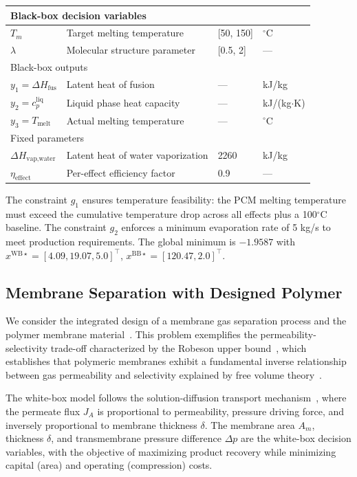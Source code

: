 \documentclass[12pt,a4paper]{article}%
\theoremstyle{plain}%
\theoremstyle{remark}%
\theoremstyle{definition}%
\def\WB{\mathrm{WB}}
\def\BB{\mathrm{BB}}
\begin{document}
\begin{appendices}
\begin{table}[htbp]
\begin{tabular}{@{}llll@{}}
\midrule
\multicolumn{4}{l}{Black-box decision variables} \\
\midrule
$T_m$ & Target melting temperature & [50, 150] & $^\circ$C \\
$\lambda$ & Molecular structure parameter & [0.5, 2] & --- \\
\midrule
\multicolumn{4}{l}{Black-box outputs} \\
\midrule
$y_1 = \Delta H_{\text{fus}}$ & Latent heat of fusion & --- & kJ/kg \\
$y_2 = c_p^{\text{liq}}$ & Liquid phase heat capacity & --- & kJ/(kg$\cdot$K) \\
$y_3 = T_{\text{melt}}$ & Actual melting temperature & --- & $^\circ$C \\
\midrule
\multicolumn{4}{l}{Fixed parameters} \\
\midrule
$\Delta H_{\text{vap,water}}$ & Latent heat of water vaporization & 2260 & kJ/kg \\
$\eta_{\text{effect}}$ & Per-effect efficiency factor & 0.9 & --- \\
\bottomrule
\end{tabular}
\end{table}

The constraint $g_1$ ensures temperature feasibility: the PCM melting temperature must exceed the cumulative temperature drop across all effects plus a 100$^\circ$C baseline. The constraint $g_2$ enforces a minimum evaporation rate of 5 kg/s to meet production requirements. The global minimum is $-1.9587$ with $x^{\WB\star} = [4.09, 19.07, 5.0]^\top$, $x^{\BB\star} = [120.47, 2.0]^\top$.

\subsection{Membrane Separation with Designed Polymer}\label{subsec:app_membrane}

We consider the integrated design of a membrane gas separation process and the polymer membrane material~\cite{qi2000membrane}. This problem exemplifies the permeability-selectivity trade-off characterized by the Robeson upper bound~\cite{robeson1991correlation,robeson2008upper}, which establishes that polymeric membranes exhibit a fundamental inverse relationship between gas permeability and selectivity explained by free volume theory~\cite{freeman1999basis}.

The white-box model follows the solution-diffusion transport mechanism~\cite{wijmans1995solution}, where the permeate flux $J_A$ is proportional to permeability, pressure driving force, and inversely proportional to membrane thickness $\delta$. The membrane area $A_m$, thickness $\delta$, and transmembrane pressure difference $\Delta p$ are the white-box decision variables, with the objective of maximizing product recovery while minimizing capital (area) and operating (compression) costs.


\end{appendices}
\end{document}
